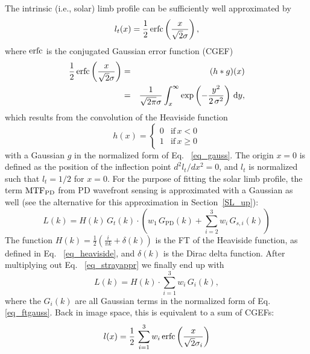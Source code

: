 \documentclass[goettingen, gauss, print]{thesis}
\begin{document}
The intrinsic (i.e., solar) limb profile can be sufficiently well approximated by
\begin{equation}
l_{t}(x) = \frac{1}{2} \, \mathrm{erfc} \left( \frac{x}{\sqrt{2} \sigma} \right),  
\end{equation}
where $\mathrm{erfc}$ is the conjugated Gaussian error function (CGEF)
\begin{eqnarray}
 \frac{1}{2} \, \mathrm{erfc}\left( \frac{x}{\sqrt{2} \sigma} \right) 
 & = & (h \ast g) (x) \nonumber \\
 & = & \frac{1}{\sqrt{2 \pi} \sigma}
 \int_{x}^{\infty} \exp \left(-\frac{y^2}{2 \, \sigma^2} \right) \,\mathrm{d} y, 
\end{eqnarray}
which results from the convolution of the Heaviside function 
\begin{equation}
\label{eq_heaviside}
h(x) = \left\{ \begin{array}{rl}
0 & \mathrm{if} \, x < 0 \\
1 & \mathrm{if} \, x \ge 0
\end{array} \right.
\end{equation}
with a Gaussian $g$ in the normalized form of Eq.~ \ref{eq_gauss}. The origin $x=0$ is defined as the position of the inflection point $d^2 l_t / d x^2 = 0$, and $l_t$ is normalized such that $l_t = 1/2$ for $x=0$. For the purpose of fitting the solar limb profile, the term $\mathrm{MTF}_{\mathrm{PD}}$ from PD wavefront sensing is approximated with a Gaussian as well (see the alternative for this approximation in Section~\ref{SL_up}):
\begin{equation}
L(k) = H(k) \, G_{t}(k) \cdot \left(w_{1} \, G_{\mathrm{PD}}(k) +
\sum_{i=2}^{3} w_{i} \, G_{s,i}(k) \right)
\label{eq_strayappr}
\end{equation}
The function $H(k) = \frac{1}{2} \left( \frac{i}{\pi k} + \delta(k) \right)$ is the FT of the Heaviside function, as defined in Eq.~ \ref{eq_heaviside}, and $\delta(k)$ is the Dirac delta function. After multiplying out Eq.~ \ref{eq_strayappr} we finally end up with
\begin{equation}
L(k) = H(k) \cdot \sum_{i=1}^{3} w_{i} \, G_{i}(k),
\label{eq_ffitfunc}
\end{equation}
where the $G_{i}(k)$ are all Gaussian terms in the normalized form of Eq.~ \ref{eq_ftgauss}. Back in image space, this is equivalent to a sum of CGEFs:
\begin{equation}
l(x) = \frac{1}{2} \, \sum_{i=1}^{3} w_{i} \, \mathrm{erfc} \left(
\frac{x}{\sqrt{2} \sigma_i} \right)
\label{eq_fitfunc} 
\end{equation}
\end{document}
